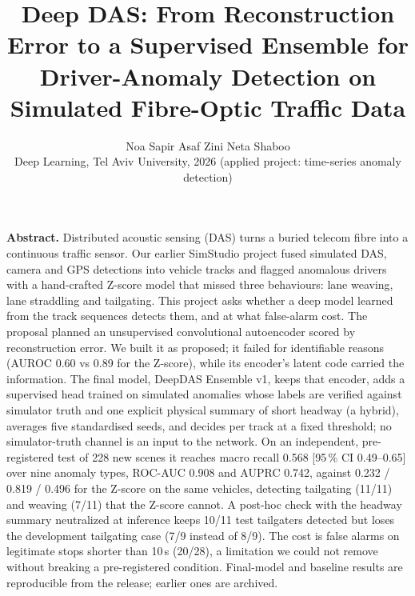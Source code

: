 \documentclass[10pt,a4paper,twocolumn]{article}
\title{\vspace{-14pt}\Large\textbf{Deep DAS: From Reconstruction Error to a Supervised Ensemble for\\ Driver-Anomaly Detection on Simulated Fibre-Optic Traffic Data}\vspace{-2pt}}
\author{\normalsize Noa Sapir \quad Asaf Zini \quad Neta Shaboo \\[-1pt] \small Deep Learning, Tel Aviv University, 2026 (applied project: time-series anomaly detection)\vspace{-14pt}}
\date{}
\newcommand{\EDIV}{DeepDAS Ensemble v1}\newcommand{\dev}{\textit{development}}\newcommand{\val}{\textit{validation}}\newcommand{\ft}{\textit{final test}}
\begin{document}
\maketitle
\thispagestyle{empty}\pagestyle{empty}

\noindent\textbf{Abstract.} Distributed acoustic sensing (DAS) turns a buried telecom fibre into a continuous traffic sensor. Our earlier SimStudio project fused simulated DAS, camera and GPS detections into vehicle tracks and flagged anomalous drivers with a hand-crafted Z-score model that missed three behaviours: lane weaving, lane straddling and tailgating. This project asks whether a deep model learned from the track sequences detects them, and at what false-alarm cost. The proposal planned an unsupervised convolutional autoencoder scored by reconstruction error. We built it as proposed; it failed for identifiable reasons (AUROC 0.60 vs 0.89 for the Z-score), while its encoder's latent code carried the information. The final model, \EDIV, keeps that encoder, adds a supervised head trained on simulated anomalies whose labels are verified against simulator truth and one explicit physical summary of short headway (a hybrid), averages five standardised seeds, and decides per track at a fixed threshold; no simulator-truth channel is an input to the network. On an independent, pre-registered test of 228 new scenes it reaches macro recall 0.568 [95\,\% CI 0.49--0.65] over nine anomaly types, ROC-AUC 0.908 and AUPRC 0.742, against 0.232 / 0.819 / 0.496 for the Z-score on the same vehicles, detecting tailgating (11/11) and weaving (7/11) that the Z-score cannot. A post-hoc check with the headway summary neutralized at inference keeps 10/11 test tailgaters detected but loses the development tailgating case (7/9 instead of 8/9). The cost is false alarms on legitimate stops shorter than 10\,s (20/28), a limitation we could not remove without breaking a pre-registered condition. Final-model and baseline results are reproducible from the release; earlier ones are archived.
\end{document}
